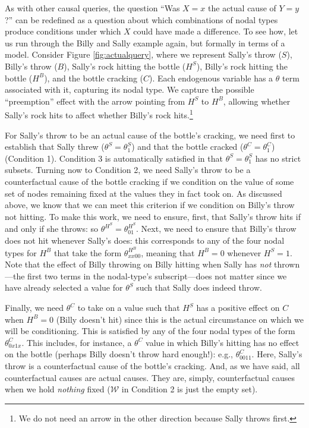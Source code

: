 \documentclass[
  12pt,
]{book}
\begin{document}
As with other causal queries, the question ``Was \(X=x\) the actual cause of \(Y=y\)?'' can be redefined as a question about which combinations of nodal types produce conditions under which \(X\) could have made a difference. To see how, let us run through the Billy and Sally example again, but formally in terms of a model. Consider Figure \ref{fig:actualquery}, where we represent Sally's throw (\(S\)), Billy's throw (\(B\)), Sally's rock hitting the bottle (\(H^S\)), Billy's rock hitting the bottle (\(H^B\)), and the bottle cracking (\(C\)). Each endogenous variable has a \(\theta\) term associated with it, capturing its nodal type. We capture the possible ``preemption'' effect with the arrow pointing from \(H^S\) to \(H^B\), allowing whether Sally's rock hits to affect whether Billy's rock hits.\footnote{We do not need an arrow in the other direction because Sally throws first.}

For Sally's throw to be an actual cause of the bottle's cracking, we need first to establish that Sally threw (\(\theta^S=\theta^S_1\)) and that the bottle cracked (\(\theta^C=\theta^C_1\)) (Condition 1). Condition 3 is automatically satisfied in that \(\theta^S=\theta^S_1\) has no strict subsets. Turning now to Condition 2, we need Sally's throw to be a counterfactual cause of the bottle cracking if we condition on the value of some set of nodes remaining fixed at the values they in fact took on. As discussed above, we know that we can meet this criterion if we condition on Billy's throw not hitting. To make this work, we need to ensure, first, that Sally's throw hits if and only if she throws: so \(\theta^{H^S}=\theta^{H^S}_{01}\). Next, we need to ensure that Billy's throw does not hit whenever Sally's does: this corresponds to any of the four nodal types for \(H^B\) that take the form \(\theta^{H^B}_{xx00}\), meaning that \(H^B=0\) whenever \(H^S=1\). Note that the effect of Billy throwing on Billy hitting when Sally has \emph{not} thrown---the first two terms in the nodal-type's subscript---does not matter since we have already selected a value for \(\theta^S\) such that Sally does indeed throw.

Finally, we need \(\theta^C\) to take on a value such that \(H^S\) has a positive effect on \(C\) when \(H^B=0\) (Billy doesn't hit) since this is the actual circumstance on which we will be conditioning. This is satisfied by any of the four nodal types of the form \(\theta^C_{0x1x}\). This includes, for instance, a \(\theta^C\) value in which Billy's hitting has no effect on the bottle (perhaps Billy doesn't throw hard enough!): e.g., \(\theta^C_{0011}\). Here, Sally's throw is a counterfactual cause of the bottle's cracking. And, as we have said, all counterfactual causes are actual causes. They are, simply, counterfactual causes when we hold \emph{nothing} fixed (\(\mathcal W\) in Condition 2 is just the empty set).
\end{document}
